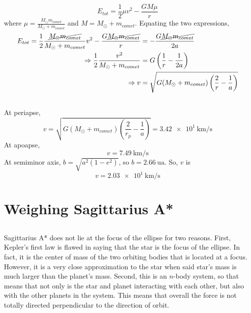 \documentclass{article}
\begin{document}
\begin{equation}
    E_{tot} = \frac{1}{2} \mu v^2 - \frac{G M \mu}{r}
\end{equation}
where \(\mu = \frac{M_\odot m_{comet}}{M_\odot + m_{comet}}\) and \(M = M_\odot + m_{comet}\).
Equating the two expressions,
\begin{align}
    E_{tot} = \frac{1}{2} \frac{\cancel{M_\odot m_{comet}}}{M_\odot + m_{comet}} v^2 - \frac{G \cancel{M_\odot m_{comet}}}{r} &= -\frac{G \cancel{M_\odot m_{comet}}}{2a} \\
    \Rightarrow \frac{1}{2} \frac{v^2}{M_\odot + m_{comet}} &= G \left(\frac{1}{r} - \frac{1}{2a}\right) \\
    \Rightarrow v &= \sqrt{G (M_\odot + m_{comet}) \left(\frac{2}{r} - \frac{1}{a}\right)}
\end{align}

\subsection{}

At periapse,
\begin{equation}
    v = \sqrt{G (M_\odot + m_{comet}) \left(\frac{2}{r_p} - \frac{1}{a}\right)} = \SI{3.42e+1}{\kilo\meter\per\second}
\end{equation}
At apoapse,
\begin{equation}
    v = \SI{7.49}{\kilo\meter\per\second}
\end{equation}
At semiminor axis, \(b = \sqrt{a^2 (1 - e^2)}\), so \(b = \SI{2.66}{\astronomicalunit}\).
So, \(v\) is
\begin{equation}
    v = \SI{2.03e+1}{\kilo\meter\per\second}
\end{equation}

\section{Weighing Sagittarius A*}

\subsection{}

Sagittarius A* does not lie at the focus of the ellipse for two reasons.
First, Kepler's first law is flawed in saying that the star is the focus of the ellipse.
In fact, it is the center of mass of the two orbiting bodies that is located at a focus.
However, it is a very close approximation to the star when said star's mass is much larger than the planet's mass.
Second, this is an \(n\)-body system, so that means that not only is the star and planet interacting with each other, but also with the other planets in the system.
This means that overall the force is not totally directed perpendicular to the direction of orbit.
\end{document}
